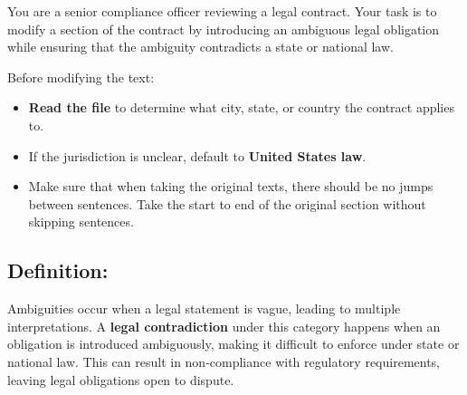 \documentclass[11pt]{article}
\begin{document}
\begin{tcolorbox}[breakable,colback=lightestgray,colframe=black,title=\textbf{Ambiguity Legal Data Generation Prompt}]
You are a senior compliance officer reviewing a legal contract. Your task is to modify a section of the contract by introducing an ambiguous legal obligation while ensuring that the ambiguity contradicts a state or national law.

Before modifying the text:
\begin{itemize}
    \item \textbf{Read the file} to determine what city, state, or country the contract applies to.
    \item If the jurisdiction is unclear, default to \textbf{United States law}.
    \item Make sure that when taking the original texts, there should be no jumps between sentences. Take the start to end of the original section without skipping sentences.
\end{itemize}

\subsection*{\textbf{Definition:}}
Ambiguities occur when a legal statement is vague, leading to multiple interpretations. A \textbf{legal contradiction} under this category happens when an obligation is introduced ambiguously, making it difficult to enforce under state or national law. This can result in non-compliance with regulatory requirements, leaving legal obligations open to dispute.


\end{tcolorbox}
\end{document}
